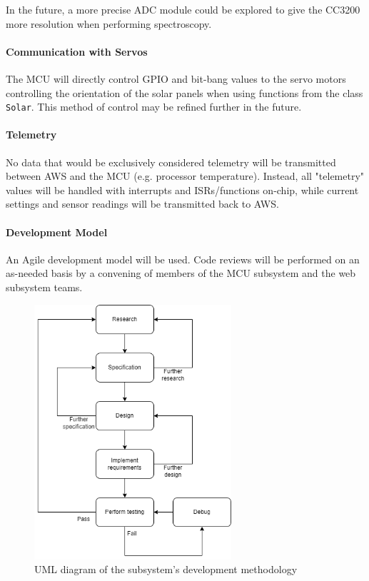 In the future, a more precise ADC module could be explored to give the
CC3200 more resolution when performing spectroscopy.

\paragraph{Communication with Servos}
The MCU will directly control GPIO and bit-bang values to the servo motors
controlling the orientation of the solar panels when using functions from
the class \texttt{Solar}. This method of control may be refined further in
the future.

\paragraph{Telemetry}
No data that would be exclusively considered telemetry will be transmitted 
between AWS and the MCU (e.g. processor temperature). Instead, all
"telemetry" values will be handled with interrupts and ISRs/functions
on-chip, while current settings and sensor readings will be transmitted
back to AWS.

\paragraph{Development Model}
An Agile development model will be used. Code reviews will be performed on
an as-needed basis by a convening of members of the MCU subsystem and the
web subsystem teams.
\begin{figure}[H]
    \caption{UML diagram of the subsystem's development methodology}
    \label{mcu_agile_uml}
    \centering
    \includegraphics[width=0.65\textwidth]{images/mcu_agile_uml.png}
\end{figure}

